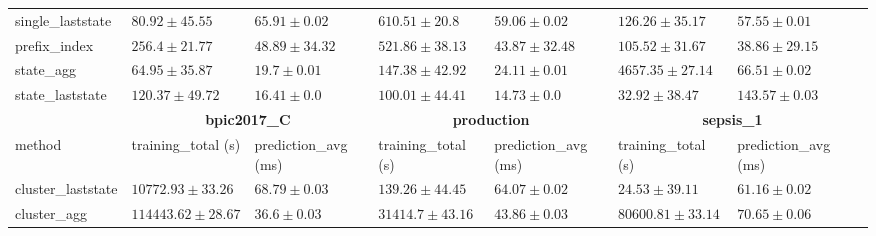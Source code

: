 \begin{table}[!htbp]
{\begin{tabular}{llllllll}
			single\_laststate & $80.92 \pm 45.55$ & $65.91 \pm 0.02$ & $610.51 \pm 20.8$ & $59.06 \pm 0.02$ & $126.26 \pm 35.17$ & $57.55 \pm 0.01$ \\ 
			prefix\_index & $256.4 \pm 21.77$ & $48.89 \pm 34.32$ & $521.86 \pm 38.13$ & $43.87 \pm 32.48$ & $105.52 \pm 31.67$ & $38.86 \pm 29.15$ \\ 
			state\_agg & $\mathbf{64.95 \pm 35.87}$ & $19.7 \pm 0.01$ & $147.38 \pm 42.92$ & $24.11 \pm 0.01$ & $4657.35 \pm 27.14$ & $66.51 \pm 0.02$ \\ 
			state\_laststate & $120.37 \pm 49.72$ & $\mathbf{16.41 \pm 0.0}$ & $\mathbf{100.01 \pm 44.41}$ & $\mathbf{14.73 \pm 0.0}$ & $\mathbf{32.92 \pm 38.47}$ & $143.57 \pm 0.03$ \\ 
			\bottomrule
			\toprule
			& \multicolumn{2}{c}{{\bfseries bpic2017\_C}} & \multicolumn{2}{c}{{\bfseries production}} & \multicolumn{2}{c}{{\bfseries sepsis\_1}} \\ \cmidrule(lr){2-3} \cmidrule(lr){4-5} \cmidrule(lr){6-7}
			method  & training\_total (s) & prediction\_avg (ms) & training\_total (s) & prediction\_avg (ms) & training\_total (s) & prediction\_avg (ms) \\ \midrule
			cluster\_laststate & $10772.93 \pm 33.26$ & $68.79 \pm 0.03$ & $139.26 \pm 44.45$ & $64.07 \pm 0.02$ & $24.53 \pm 39.11$ & $61.16 \pm 0.02$ \\ 
			cluster\_agg & $114443.62 \pm 28.67$ & $36.6 \pm 0.03$ & $31414.7 \pm 43.16$ & $43.86 \pm 0.03$ & $80600.81 \pm 33.14$ & $70.65 \pm 0.06$ \\ 
			

\end{tabular}}
\end{table}
